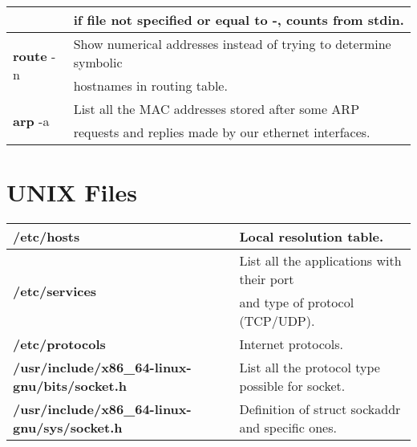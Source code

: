 \begin{table}[h]
\begin{tabular}{|l|l|l|}
\multicolumn{2}{|l|}{} & {if file not specified or equal to -, counts from stdin.}\\
\hline
\multicolumn{2}{|l|}{\multirow{2}{*}{\textbf{route} -n}} & {Show numerical addresses instead of trying to determine symbolic}\\
\multicolumn{2}{|l|}{} & {hostnames in routing table.}\\
\hline
\multicolumn{2}{|l|}{\multirow{2}{*}{\textbf{arp} -a}} & {List all the MAC addresses stored after some ARP}\\
\multicolumn{2}{|l|}{} & {requests and replies made by our ethernet interfaces.}\\
\hline
\end{tabular}
\end{table}


\section{UNIX Files}\label{files}
\begin{table}[h]
\centering
\footnotesize
\begin{tabular}{|l|l|}
\hline
\textbf{/etc/hosts} & {Local resolution table.}\\
\hline
\multirow{2}{*}{\textbf{/etc/services}} & {List all the applications with their port}\\
& {and type of protocol (TCP/UDP).}\\
\hline
{\textbf{/etc/protocols}} & {Internet protocols.}\\
\hline
{\textbf{/usr/include/x86\_64-linux-gnu/bits/socket.h}} & {List all the protocol type possible for socket.}\\
\hline
{\textbf{/usr/include/x86\_64-linux-gnu/sys/socket.h}} & {Definition of struct sockaddr and specific ones.}\\
\hline
\end{tabular}
\end{table}

